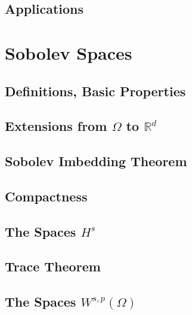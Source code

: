 \documentclass[letterpaper,twoside,12pt]{article}
\theoremstyle{mystyle}
\newcommand{\R}{{\mathbb R}}
\begin{document}
\subsection{Applications}











































\newpage\section{Sobolev Spaces}
\subsection{Definitions, Basic Properties}
\subsection{Extensions from $\Omega$ to $\R^d$}
\subsection{Sobolev Imbedding Theorem}
\subsection{Compactness}
\subsection{The Spaces $H^s$}
\subsection{Trace Theorem}
\subsection{The Spaces $W^{s, p}\left( \Omega \right)$}
\end{document}
